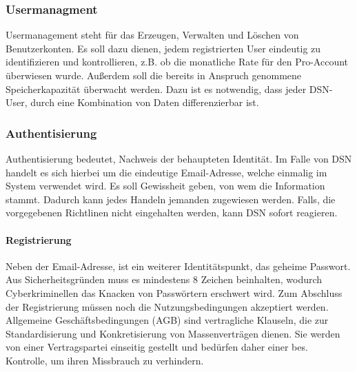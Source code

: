 
\subsubsection{Usermanagment}
Usermanagement steht für das Erzeugen, Verwalten und Löschen von Benutzerkonten. Es soll dazu dienen, jedem registrierten User eindeutig zu identifizieren und kontrollieren, z.B. ob die monatliche Rate für den Pro-Account überwiesen wurde. Außerdem soll die bereits in Anspruch genommene Speicherkapazität überwacht werden. Dazu ist es notwendig, dass jeder DSN-User, durch eine Kombination von Daten differenzierbar ist.
\subsubsection{Authentisierung}
Authentisierung bedeutet, Nachweis der behaupteten Identität. Im Falle von DSN handelt es sich hierbei um die eindeutige Email-Adresse, welche einmalig im System verwendet wird. Es soll Gewissheit geben, von wem die Information stammt. Dadurch kann jedes Handeln jemanden zugewiesen werden. Falls, die vorgegebenen Richtlinen nicht eingehalten werden, kann DSN sofort reagieren.
\paragraph{Registrierung}
Neben der Email-Adresse, ist ein weiterer Identitätspunkt, das geheime Passwort. Aus Sicherheitsgründen muss es mindestens 8 Zeichen beinhalten, wodurch Cyberkriminellen das Knacken von Passwörtern erschwert wird. Zum Abschluss der Registrierung müssen noch die Nutzungsbedingungen akzeptiert werden.\\
\grqq{}Allgemeine Geschäftsbedingungen (AGB) sind vertragliche Klauseln, die zur Standardisierung und Konkretisierung von Massenverträgen dienen. Sie werden von einer Vertragspartei einseitig gestellt und bedürfen daher einer bes. Kontrolle, um ihren Missbrauch zu verhindern.\grqq{}\cite{AGB}\\
\cite{VERTEILTE_SYSTEME}\cite{PASSWORT_SCHUTZ}\\


